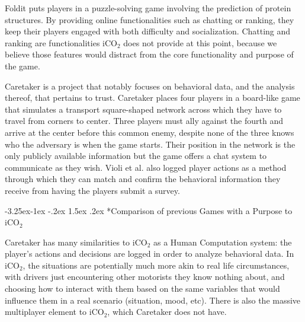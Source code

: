 \documentclass[preprint,authoryear,12pt]{elsarticle}
\makeatletter
\renewcommand{\paragraph}{\@startsection{paragraph}{4}{\z@}%
  {-3.25ex\@plus -1ex \@minus -.2ex}%
  {1.5ex \@plus .2ex}%
  {\normalfont\normalsize\mdseries}}
\makeatother
\begin{document}

Foldit \citep{cooper2010predicting} puts players in a puzzle-solving game involving the prediction of protein structures. By providing online functionalities such as chatting or ranking, they keep their players engaged with both difficulty and socialization. Chatting and ranking are functionalities iCO$_2$ does not provide at this point, because we believe those features would distract from the core functionality and purpose of the game.


Caretaker \citep{Violi:2011} is a project that notably focuses on behavioral data, and the analysis thereof, that pertains to trust. Caretaker places four players in a board-like game that simulates a transport square-shaped network across which they have to travel from corners to center. Three players must ally against the fourth and arrive at the center before this common enemy, despite none of the three knows who the adversary is when the game starts. Their position in the network is the only publicly available information but the game offers a chat system to communicate as they wish. Violi et al. also logged player actions as a method through which they can match and confirm the behavioral information they receive from having the players submit a survey.

\paragraph*{Comparison of previous Games with a Purpose to iCO$_2$}

Caretaker has many similarities to iCO$_2$ as a Human Computation system: the player's actions and decisions are logged in order to analyze behavioral data.
In iCO$_2$, the situations are potentially much more akin to real life circumstances, with drivers just encountering other motorists they know nothing about, and choosing how to interact with them based on the same variables that would influence them in a real scenario (situation, mood, etc). There is also the massive multiplayer element to iCO$_2$, which Caretaker does not have.
\end{document}
